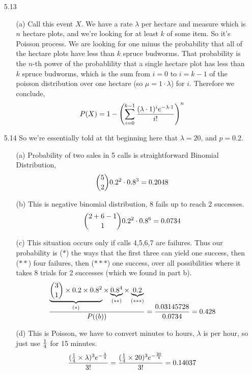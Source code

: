 \documentclass[english, 11pt]{article}
\begin{document}
\begin{itemize}
    \item[5.13]
    \begin{itemize}
      \item[(a)] Call this event $X$. We have a rate $\lambda$ per hectare and measure which is $n$ hectare plots, and we're looking for at least $k$ of some item. So it's Poisson process. We are looking for one minus the probability that all of the hectare plots have less than $k$ spruce budworms. That probability is the $n$-th power of the probablility that a single hectare plot has less than $k$ spruce budworms, which is the sum from $i = 0$ to $i = k - 1$ of the poisson distribution over one hectare (so $\mu = 1 \cdot \lambda$) for $i$. Therefore we conclude,
      \[P(X) =  1 - \left( \sum_{i = 0}^{k-1} \frac{(\lambda \cdot 1)^ie^{-\lambda \cdot 1}}{i!} \right)^n \]
    \end{itemize}

    \item[5.14] So we're essentially told at tht beginning here that $\lambda = 20$, and $p = 0.2$.
    \begin{itemize}
      \item[(a)] Probability of two sales in 5 calls is straightforward Binomial Distribution,
      \[ {5 \choose 2}0.2^2\cdot0.8^3 = 0.2048 \]
      \item[(b)] This is negative binomial distribution, 8 fails up to reach 2 successes.
      \[ {2 + 6 - 1 \choose 1} 0.2^2\cdot 0.8^6 = 0.0734\]
      \item[(c)] This situation occurs only if calls 4,5,6,7 are failures. Thus our probability is ($*$) the ways that the first three can yield one success, then ($**$) four failures, then ($***$) one success, over all possibilities where it takes 8 trials for 2 successes (which we found in part b).
      \[ \frac{\underbrace{{3 \choose 1}\times 0.2 \times 0.8^2}_{(*)} \times \underbrace{0.8^4}_{(**)} \times \underbrace{0.2}_{(***)}}{P((b))} = \frac{0.03145728}{0.0734} = 0.428 \]

      \item[(d)] This is Poisson, we have to convert minutes to hours, $\lambda$ is per hour, so just use $\frac{1}{4}$ for 15 minutes.
      \[ \frac{(\frac{1}{4}\times\lambda)^3e^{-\frac{\lambda}{4}}}{3!} = \frac{(\frac{1}{4}\times20)^3e^{-\frac{20}{4}}}{3!} = 0.14037 \]
    \end{itemize}


\end{itemize}
\end{document}
